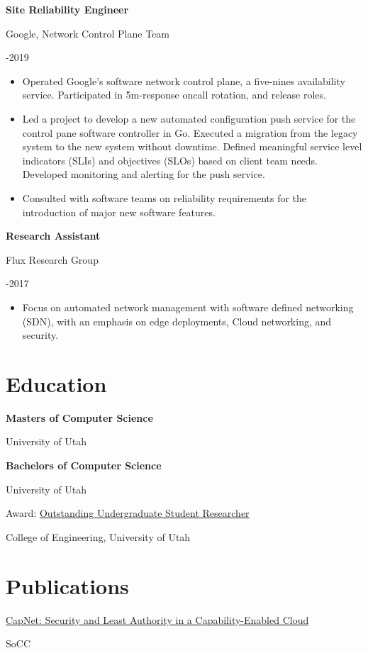 \documentclass[10pt]{article}
\newcommand{\triline}[3]{%
    \parbox[t][][t]{.4\linewidth}{ #1 }%
    \parbox[t][][t]{.4\linewidth}{ #2 }%
    \parbox[t][][t]{.2\linewidth}{\raggedleft #3 }%
    \vspace{1ex}
}
\newcommand{\publication}[3]{%
    \parbox[t][][t]{.8\linewidth}{ #1 }%
    \parbox[t][][t]{.15\linewidth}{ #2 }%
    \parbox[t][][t]{.05\linewidth}{\raggedleft #3 }%
    \vspace{0.5ex}
}
\newcommand{\award}[3]{%
    \parbox[t][][t]{.5\linewidth}{ #1 }%
    \parbox[t][][t]{.4\linewidth}{ #2 }%
    \parbox[t][][t]{.1\linewidth}{\raggedleft #3 }%
}
\newlength{\listpostvertical}
\begin{document}
\triline{\textbf{Site Reliability Engineer}}{Google, Network Control Plane Team}{2017-2019}

\begin{itemize}[nosep]
\item Operated Google's software network control plane, a five-nines
      availability service. Participated in 5m-response oncall rotation, and
      release roles.
\item Led a project to develop a new automated configuration push service for
      the control pane software controller in Go. Executed a migration from
      the legacy system to the new system without downtime. Defined meaningful
      service level indicators (SLIs) and objectives (SLOs) based on client
      team needs. Developed monitoring and alerting for the push service.
\item Consulted with software teams on reliability requirements for the
      introduction of major new software features.
\end{itemize}
\vspace{\listpostvertical}

\triline{\bf Research Assistant}{Flux Research Group}{2014-2017}

\begin{itemize}[nosep]
\item Focus on automated network management with software defined
      networking (SDN), with an emphasis on edge deployments, Cloud networking,
      and security.
\end{itemize}

\section{Education}

\award{\bf Masters of Computer Science}{University of Utah}{2017}

\award{\bf Bachelors of Computer Science}{University of Utah}{2017}

\award{\small Award: %
    \href{https://our.utah.edu/for-students/outstanding-undergraduate-researcher-award/}%
         {Outstanding Undergraduate Student Researcher}%
}{College of Engineering, University of Utah}{2015}


\section{Publications}

\publication%
    {\small%
     \href{https://doi.org/10.1145/3127479.3131209}%
          {CapNet: Security and Least Authority in a Capability-Enabled Cloud}}%
    {SoCC}%
    {2017}
\end{document}
